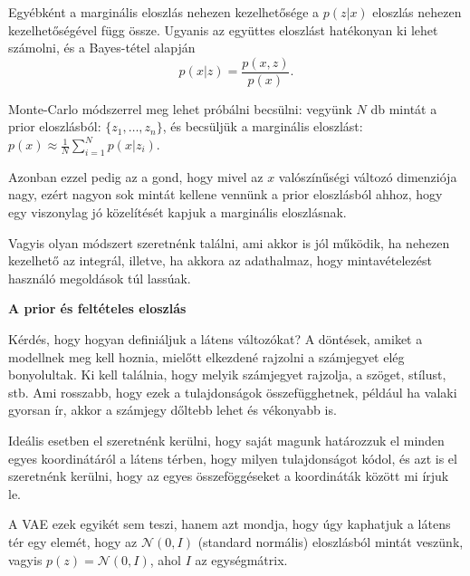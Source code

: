 \documentclass[12pt]{amsart}
\begin{document}
\vspace{5pt}

Egyébként a marginális eloszlás nehezen kezelhetősége a
$p(z|x)$ eloszlás nehezen kezelhetőségével függ
össze. Ugyanis az együttes eloszlást hatékonyan ki lehet
számolni, és a Bayes-tétel alapján 
\[
  p(x|z) = \frac{p(x,z)}{p(x)}.
\]

\vspace{5pt}

Monte-Carlo módszerrel meg lehet próbálni becsülni: vegyünk
$N$ db mintát a prior eloszlásból: $\{z_1, \dots, z_n\}$, és
becsüljük a marginális eloszlást: $p(x)\approx \frac{1}{N}
\sum_{i=1}^N p(x|z_i)$.

\vspace{5pt}

Azonban ezzel pedig az a gond, hogy mivel az $x$
valószínűségi változó dimenziója nagy, ezért nagyon sok
mintát kellene vennünk a prior eloszlásból ahhoz, hogy egy
viszonylag jó közelítését kapjuk a marginális eloszlásnak. 

\vspace{5pt}

Vagyis olyan módszert szeretnénk találni, ami akkor is jól
működik, ha nehezen kezelhető az integrál, illetve, ha
akkora az adathalmaz, hogy mintavételezést használó
megoldások túl lassúak.  

\vspace{10pt}

\textbf{A prior és feltételes eloszlás}

\vspace{10pt}

Kérdés, hogy hogyan definiáljuk a látens változókat? A
döntések, amiket a modellnek meg kell hoznia, mielőtt
elkezdené rajzolni a számjegyet elég bonyolultak. Ki kell
találnia, hogy melyik számjegyet rajzolja, a szöget,
stílust, stb. Ami rosszabb, hogy ezek a tulajdonságok
összefügghetnek, például ha valaki gyorsan ír, akkor a
számjegy dőltebb lehet és vékonyabb is.

\vspace{5pt}

Ideális esetben el szeretnénk kerülni, hogy saját magunk
határozzuk el minden egyes koordinátáról a látens térben,
hogy milyen tulajdonságot kódol, és azt is el szeretnénk
kerülni, hogy az egyes összeföggéseket a koordináták között
mi írjuk le.

\vspace{5pt}

A VAE ezek egyikét sem teszi, hanem azt mondja, hogy úgy
kaphatjuk a látens tér egy elemét, hogy az
$\mathcal{N}(0, I)$ (standard normális) eloszlásból mintát
veszünk, vagyis $p(z) = \mathcal{N}(0, I)$, ahol $I$ az
egységmátrix. 
\end{document}
